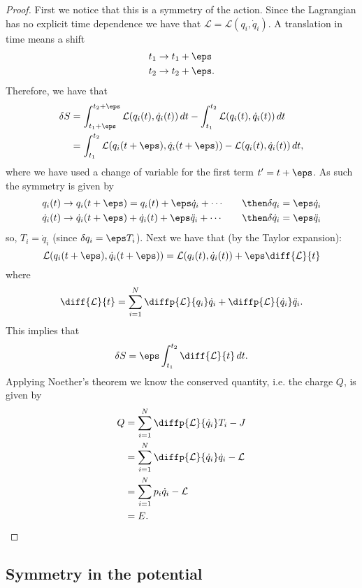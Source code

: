 \documentclass[12pt, a4paper]{article}
\newcommand{\LL}{\mathcal L}
\begin{document}
\begin{proof}
    First we notice that this is a symmetry of the action. Since the Lagrangian has no explicit time dependence we have that \(\LL=\LL(q_i,\dot{q}_i)\). A translation in time means a shift 
    \[\begin{aligned}
        t_1 &\to t_1 +\eps \\
        t_2 &\to t_2 +\eps.
    \end{aligned}\]
    Therefore, we have that 
    \[\begin{aligned}
        \delta S &= \int_{t_1+\eps}^{t_2+\eps} \LL(q_i(t),\dot{q}_i(t)) \, dt - \int_{t_1}^{t_2}\LL(q_i(t),\dot{q}_i(t)) \, dt \\
        &= \int_{t_1}^{t_2} \LL(q_i(t+\eps),\dot{q}_i(t+\eps))-\LL(q_i(t),\dot{q}_i(t)) \, dt,
    \end{aligned}\]
    where we have used a change of variable for the first term \(t'=t+\eps\). As such the symmetry is given by 
    \[\begin{aligned}
        q_i(t) &\to q_i(t+\eps) =q_i(t)+\eps\dot{q}_i +\cdots \quad &\then \delta q_i =\eps\dot{q}_i \\
        \dot{q}_i(t) &\to \dot{q}_i(t+\eps)+\dot{q}_i(t)+\eps\ddot{q}_i+\cdots \quad &\then \delta \dot{q}_i =\eps\ddot{q}_i
    \end{aligned}\]
    so, \(T_i =\dot{q}_i\) (since \(\delta q_i =\eps T_i\)). Next we have that (by the Taylor expansion):
    \[\LL(q_i(t+\eps),\dot{q}_i(t+\eps))=\LL(q_i(t),\dot{q}_i(t))+\eps \diff{\LL}{t}\]
    where 
    \[\diff{\LL}{t} = \sum_{i=1}^{N} \diffp{\LL}{{q_i}}\dot{q}_i +\diffp{\LL}{{\dot{q}_i}}\ddot{q}_i.\]
    This implies that 
    \[\delta S = \eps \int_{t_1}^{t_2} \diff{\LL}{t} \, dt.\]
    Applying Noether's theorem we know the conserved quantity, i.e. the charge \(Q\), is given by
    \[\begin{aligned}
        Q &= \sum_{i=1}^{N} \diffp{\LL}{{\dot{q}_i}}T_i -J \\
        &= \sum_{i=1}^{N} \diffp{\LL}{{\dot{q}_i}}\dot{q}_i-\LL \\
        &= \sum_{i=1}^{N}p_i \dot{q}_i-\LL \\
        &= E.
    \end{aligned}\]
\end{proof}

\subsection{Symmetry in the potential}
\end{document}
